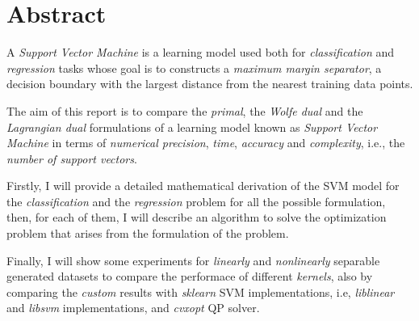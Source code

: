 \section{Abstract}

A \emph{Support Vector Machine} is a learning model used both for \emph{classification} and \emph{regression} tasks whose goal is to constructs a \emph{maximum margin separator}, a decision boundary with the largest distance from the nearest training data points.

The aim of this report is to compare the \emph{primal}, the \emph{Wolfe dual} and the \emph{Lagrangian dual} formulations of a learning model known as \emph{Support Vector Machine} in terms of \emph{numerical precision}, \emph{time}, \emph{accuracy} and \emph{complexity}, i.e., the \emph{number of support vectors}.

Firstly, I will provide a detailed mathematical derivation of the SVM model for the \emph{classification} and the \emph{regression} problem for all the possible formulation, then, for each of them, I will describe an algorithm to solve the optimization problem that arises from the formulation of the problem.

Finally, I will show some experiments for \emph{linearly} and \emph{nonlinearly} separable generated datasets to compare the performace of different \emph{kernels}, also by comparing the \emph{custom} results with \emph{sklearn} SVM implementations, i.e, \emph{liblinear} and \emph{libsvm} implementations, and \emph{cvxopt} QP solver.
